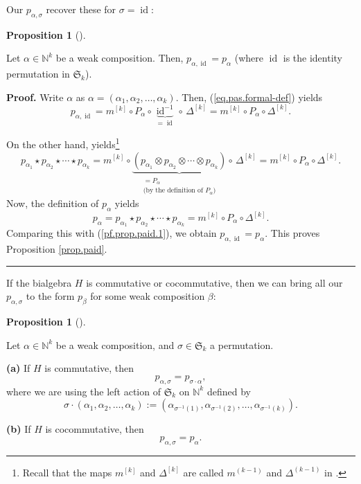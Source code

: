 \documentclass[numbers=enddot,12pt,final,onecolumn,notitlepage]{scrartcl}%
\theoremstyle{definition}
\newtheorem{prop}[theo]{Proposition}
\newenvironment{proposition}[1][]
{\begin{prop}[#1]\begin{leftbar}}
{\end{leftbar}\end{prop}}
\newenvironment{proof}[1][Proof]{\noindent\textbf{#1.} }{\ \rule{0.5em}{0.5em}}
\begin{document}
Our $p_{\alpha,\sigma}$ recover these for $\sigma=\operatorname*{id}$:

\begin{proposition}
\label{prop.paid}Let $\alpha\in\mathbb{N}^{k}$ be a weak composition. Then,
$p_{\alpha,\operatorname*{id}}=p_{\alpha}$ (where $\operatorname*{id}$ is the
identity permutation in $\mathfrak{S}_{k}$).
\end{proposition}

\begin{proof}
Write $\alpha$ as $\alpha=\left(  \alpha_{1},\alpha_{2},\ldots,\alpha
_{k}\right)  $. Then, (\ref{eq.pas.formal-def}) yields%
\begin{equation}
p_{\alpha,\operatorname*{id}}=m^{\left[  k\right]  }\circ P_{\alpha}%
\circ\underbrace{\operatorname*{id}\nolimits^{-1}}_{=\operatorname*{id}}%
\circ\,\Delta^{\left[  k\right]  }=m^{\left[  k\right]  }\circ P_{\alpha}%
\circ\Delta^{\left[  k\right]  }. \label{pf.prop.paid.1}%
\end{equation}


On the other hand, \cite[Exercise 1.4.23]{GriRei} yields\footnote{Recall that
the maps $m^{\left[  k\right]  }$ and $\Delta^{\left[  k\right]  }$ are called
$m^{\left(  k-1\right)  }$ and $\Delta^{\left(  k-1\right)  }$ in
\cite{GriRei}.}%
\[
p_{\alpha_{1}}\star p_{\alpha_{2}}\star\cdots\star p_{\alpha_{k}}=m^{\left[
k\right]  }\circ\underbrace{\left(  p_{\alpha_{1}}\otimes p_{\alpha_{2}%
}\otimes\cdots\otimes p_{\alpha_{k}}\right)  }_{\substack{=P_{\alpha
}\\\text{(by the definition of }P_{\alpha}\text{)}}}\circ\,\Delta^{\left[
k\right]  }=m^{\left[  k\right]  }\circ P_{\alpha}\circ\Delta^{\left[
k\right]  }.
\]
Now, the definition of $p_{\alpha}$ yields%
\begin{equation}
p_{\alpha}=p_{\alpha_{1}}\star p_{\alpha_{2}}\star\cdots\star p_{\alpha_{k}%
}=m^{\left[  k\right]  }\circ P_{\alpha}\circ\Delta^{\left[  k\right]  }.
\label{pf.prop.paid.2}%
\end{equation}
Comparing this with (\ref{pf.prop.paid.1}), we obtain $p_{\alpha
,\operatorname*{id}}=p_{\alpha}$. This proves Proposition \ref{prop.paid}.
\end{proof}

If the bialgebra $H$ is commutative or cocommutative, then we can bring all
our $p_{\alpha,\sigma}$ to the form $p_{\beta}$ for some weak composition
$\beta$:

\begin{proposition}
\label{prop.pas.comm}Let $\alpha\in\mathbb{N}^{k}$ be a weak composition, and
$\sigma\in\mathfrak{S}_{k}$ a permutation. \medskip

\textbf{(a)} If $H$ is commutative, then%
\[
p_{\alpha,\sigma}=p_{\sigma\cdot\alpha},
\]
where we are using the left action of $\mathfrak{S}_{k}$ on $\mathbb{N}^{k}$
defined by
\[
\sigma\cdot\left(  \alpha_{1},\alpha_{2},\ldots,\alpha_{k}\right)  :=\left(
\alpha_{\sigma^{-1}\left(  1\right)  },\alpha_{\sigma^{-1}\left(  2\right)
},\ldots,\alpha_{\sigma^{-1}\left(  k\right)  }\right)  .
\]


\textbf{(b)} If $H$ is cocommutative, then%
\[
p_{\alpha,\sigma}=p_{\alpha}.
\]

\end{proposition}
\end{document}
